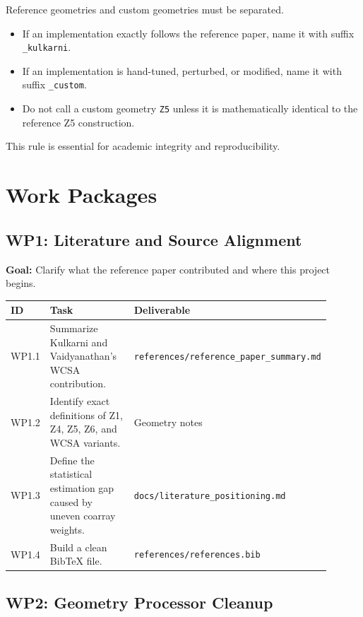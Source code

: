 \documentclass[11pt,letterpaper]{article}
\newcommand{\codepath}[1]{\texttt{#1}}
\begin{document}
Reference geometries and custom geometries must be separated.

\begin{itemize}[leftmargin=*]
    \item If an implementation exactly follows the reference paper, name it with suffix \codepath{\_kulkarni}.
    \item If an implementation is hand-tuned, perturbed, or modified, name it with suffix \codepath{\_custom}.
    \item Do not call a custom geometry \codepath{Z5} unless it is mathematically identical to the reference Z5 construction.
\end{itemize}

This rule is essential for academic integrity and reproducibility.

\section{Work Packages}

\subsection{WP1: Literature and Source Alignment}

\textbf{Goal:} Clarify what the reference paper contributed and where this project begins.

\begin{longtable}{p{0.08\linewidth}p{0.52\linewidth}p{0.30\linewidth}}
\toprule
ID & Task & Deliverable \\
\midrule
WP1.1 & Summarize Kulkarni and Vaidyanathan's WCSA contribution. & \codepath{references/reference\_paper\_summary.md} \\
WP1.2 & Identify exact definitions of Z1, Z4, Z5, Z6, and WCSA variants. & Geometry notes \\
WP1.3 & Define the statistical estimation gap caused by uneven coarray weights. & \codepath{docs/literature\_positioning.md} \\
WP1.4 & Build a clean BibTeX file. & \codepath{references/references.bib} \\
\bottomrule
\end{longtable}

\subsection{WP2: Geometry Processor Cleanup}
\end{document}
